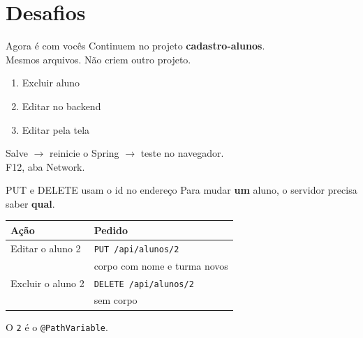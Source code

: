\documentclass[aspectratio=169,11pt]{beamer}
\begin{document}
\section{Desafios}

\begin{frame}{Agora é com vocês}
  Continuem no projeto \textbf{cadastro-alunos}.\\
  Mesmos arquivos. Não criem outro projeto.

  \vspace{0.5em}
  \begin{enumerate}
    \item Excluir aluno
    \item Editar no backend
    \item Editar pela tela
  \end{enumerate}

  \vspace{0.5em}
  Salve $\rightarrow$ reinicie o Spring $\rightarrow$ teste no navegador.\\
  F12, aba Network.
\end{frame}

\begin{frame}{PUT e DELETE usam o id no endereço}
  Para mudar \textbf{um} aluno, o servidor precisa saber
  \textbf{qual}.

  \vspace{0.5em}
  \begin{center}
  \begin{tabular}{ll}
    \toprule
    Ação & Pedido \\
    \midrule
    Editar o aluno 2 & \texttt{PUT /api/alunos/2} \\
      & corpo com nome e turma novos \\
    Excluir o aluno 2 & \texttt{DELETE /api/alunos/2} \\
      & sem corpo \\
    \bottomrule
  \end{tabular}
  \end{center}

  \vspace{0.5em}
  O \texttt{2} é o \texttt{@PathVariable}.
\end{frame}
\end{document}
